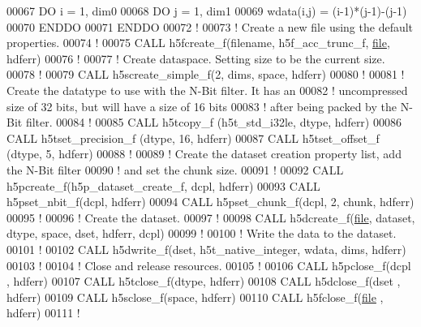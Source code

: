\begin{DoxyCode}
00067   \textcolor{keywordflow}{DO} i = 1, dim0
00068      \textcolor{keywordflow}{DO} j = 1, dim1
00069         wdata(i,j) = (i-1)*(j-1)-(j-1)
00070 \textcolor{keywordflow}{     ENDDO}
00071 \textcolor{keywordflow}{  ENDDO}
00072   \textcolor{comment}{!    }
00073   \textcolor{comment}{! Create a new file using the default properties.}
00074   \textcolor{comment}{!}
00075   \textcolor{keyword}{CALL }h5fcreate\_f(filename, h5f\_acc\_trunc\_f, \hyperlink{structfile}{file}, hdferr)
00076   \textcolor{comment}{!}
00077   \textcolor{comment}{! Create dataspace.  Setting size to be the current size.}
00078   \textcolor{comment}{!}
00079   \textcolor{keyword}{CALL }h5screate\_simple\_f(2, dims, space, hdferr)
00080   \textcolor{comment}{!}
00081   \textcolor{comment}{! Create the datatype to use with the N-Bit filter.  It has an}
00082   \textcolor{comment}{! uncompressed size of 32 bits, but will have a size of 16 bits}
00083   \textcolor{comment}{! after being packed by the N-Bit filter.}
00084   \textcolor{comment}{!}
00085   \textcolor{keyword}{CALL }h5tcopy\_f (h5t\_std\_i32le, dtype, hdferr)
00086   \textcolor{keyword}{CALL }h5tset\_precision\_f (dtype, 16, hdferr)
00087   \textcolor{keyword}{CALL }h5tset\_offset\_f (dtype, 5, hdferr)
00088   \textcolor{comment}{!}
00089   \textcolor{comment}{! Create the dataset creation property list, add the N-Bit filter}
00090   \textcolor{comment}{! and set the chunk size.}
00091   \textcolor{comment}{!}
00092   \textcolor{keyword}{CALL }h5pcreate\_f(h5p\_dataset\_create\_f, dcpl, hdferr)
00093   \textcolor{keyword}{CALL }h5pset\_nbit\_f(dcpl, hdferr)
00094   \textcolor{keyword}{CALL }h5pset\_chunk\_f(dcpl, 2, chunk, hdferr)
00095   \textcolor{comment}{!}
00096   \textcolor{comment}{! Create the dataset.}
00097   \textcolor{comment}{!}
00098   \textcolor{keyword}{CALL }h5dcreate\_f(\hyperlink{structfile}{file}, dataset, dtype, space, dset, hdferr, dcpl)
00099   \textcolor{comment}{!}
00100   \textcolor{comment}{! Write the data to the dataset.}
00101   \textcolor{comment}{!}
00102   \textcolor{keyword}{CALL }h5dwrite\_f(dset, h5t\_native\_integer, wdata, dims, hdferr)
00103   \textcolor{comment}{!}
00104   \textcolor{comment}{! Close and release resources.}
00105   \textcolor{comment}{!}
00106   \textcolor{keyword}{CALL }h5pclose\_f(dcpl , hdferr)
00107   \textcolor{keyword}{CALL }h5tclose\_f(dtype, hdferr)
00108   \textcolor{keyword}{CALL }h5dclose\_f(dset , hdferr)
00109   \textcolor{keyword}{CALL }h5sclose\_f(space, hdferr)
00110   \textcolor{keyword}{CALL }h5fclose\_f(\hyperlink{structfile}{file} , hdferr)
00111   \textcolor{comment}{!}

\end{DoxyCode}
